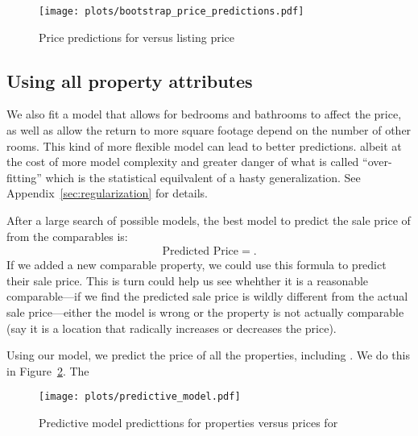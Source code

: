 \documentclass[
12pt, %
letterpaper, %
oneside, %
headinclude,footinclude, %
BCOR5mm, %
]{scrartcl}
\begin{document}
\begin{figure}
\centering
\caption{Price predictions for \PropertyName{} versus listing price} \label{fig:bootstrap_price_predictions}  
\texttt{[image: plots/bootstrap\_price\_predictions.pdf]} 
\end{figure}

\subsection{Using all property attributes}
We also fit a model that allows for bedrooms and bathrooms to affect the price, as well as allow the return to more square footage depend on the number of other rooms.
This kind of more flexible model can lead to better predictions. albeit at the cost of more model complexity and greater danger of what is called ``over-fitting'' which is the statistical equilvalent of a hasty generalization.
See Appendix~\ref{sec:regularization} for details. 

After a large search of possible models, the best model to predict the sale price of \PropertyName{} from the comparables is: 
\begin{align}
\mbox{Predicted Price} = .
\end{align}
If we added a new comparable property, we could use this formula to predict their sale price.
This is turn could help us see whehther it is a reasonable comparable---if we find the predicted sale price is wildly different from the actual sale price---either the model is wrong or the property is not actually comparable (say it is a location that radically increases or decreases the price). 

Using our model, we predict the price of all the properties, including \PropertyName{}.
We do this in Figure~\ref{fig:predictive_model}.
The 

\begin{figure}
\centering
\caption{Predictive model predicttions for properties versus prices for \PropertyName{}} \label{fig:predictive_model}  
\texttt{[image: plots/predictive\_model.pdf]} 
\end{figure}

\renewcommand{\refname}{\spacedlowsmallcaps{References}} %


\pagebreak

\appendix
\end{document}
